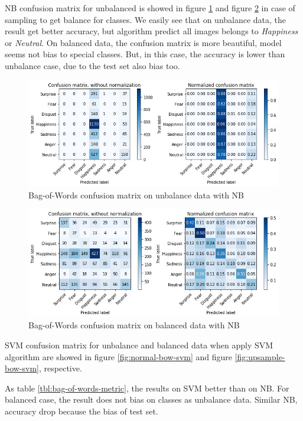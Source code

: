 \documentclass[12pt]{article}
\begin{document}
NB confusion matrix for unbalanced is showed in figure \ref{fig:normal-bow-nb} and figure \ref{fig:upsample-bow-nb} in case of sampling to get balance for classes.
We easily see that on unbalance data, the result get better accuracy, but algorithm predict all images belongs to \textit{Happiness} or \textit{Neutral}.
On balanced data, the confusion matrix is more beautiful, model seems not bias to special classes.
But, in this case, the accuracy is lower than unbalance case, due to the test set also bias too.

\begin{figure} [h!]
    \centering
    \includegraphics[width=\textwidth]{imgs/n-bow-nb.jpg}
    \caption{Bag-of-Words confusion matrix on unbalance data with NB}
    \label{fig:normal-bow-nb}
\end{figure}

\begin{figure} [h!]
    \centering
    \includegraphics[width=\textwidth]{imgs/upsample-bow-nb.jpg}
    \caption{Bag-of-Words confusion matrix on balanced data with NB}
    \label{fig:upsample-bow-nb}
\end{figure}
       
SVM confusion matrix for unbalance and balanced data when apply SVM algorithm are showed in figure \ref{fig:normal-bow-svm} and figure \ref{fig:upsample-bow-svm}, respective.

As table \ref{tbl:bag-of-words-metric}, the results on SVM better than on NB.
For balanced case, the result does not bias on classes as unbalance data.
Similar NB, accuracy drop because the bias of test set.
\end{document}
